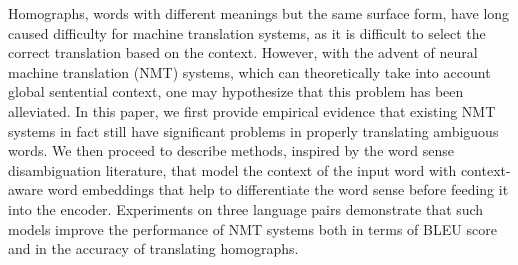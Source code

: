 Homographs, words with different meanings but the same surface form, have long caused difficulty for machine translation systems, as it is difficult to select the correct translation based on the context. However, with the advent of neural machine translation (NMT) systems, which can theoretically take into account global sentential context, one may hypothesize that this problem has been alleviated. In this paper, we first provide empirical evidence that existing NMT systems in fact still have significant problems in properly translating ambiguous words. We then proceed to describe methods, inspired by the word sense disambiguation literature, that model the context of the input word with context-aware word embeddings that help to differentiate the word sense before feeding it into the encoder. Experiments on three language pairs demonstrate that such models improve the performance of NMT systems both in terms of BLEU score and in the accuracy of translating homographs.
